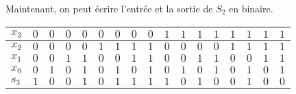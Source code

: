\documentclass{article}
\begin{document}
Maintenant, on peut écrire l'entrée et la sortie de $S_{2}$ en binaire.
\medbreak
\begin{center}
\begin{tabular}{|l|l|l|l|l|l|l|l|l|l|l|l|l|l|l|l|l|}
\hline
\multicolumn{1}{|l|}{$x_{3}$}&	\multicolumn{1}{|l|}{ $0$}&	\multicolumn{1}{|l|}{ $0$}&	\multicolumn{1}{|l|}{ $0$}&	\multicolumn{1}{|l|}{ $0$}&	\multicolumn{1}{|l|}{ $0$}&	\multicolumn{1}{|l|}{ $0$}&	\multicolumn{1}{|l|}{ $0$}&	\multicolumn{1}{|l|}{ $0$}&	\multicolumn{1}{|l|}{ $1$}&	\multicolumn{1}{|l|}{ $1$}&	\multicolumn{1}{|l|}{ $1$}&	\multicolumn{1}{|l|}{ $1$}&	\multicolumn{1}{|l|}{ $1$}&	\multicolumn{1}{|l|}{ $1$}&	\multicolumn{1}{|l|}{ $1$}&	\multicolumn{1}{|l|}{ $1$}	\\
\hline
\multicolumn{1}{|l|}{ $x_{2}$}&	\multicolumn{1}{|l|}{ $0$}&	\multicolumn{1}{|l|}{ $0$}&	\multicolumn{1}{|l|}{ $0$}&	\multicolumn{1}{|l|}{ $0$}&	\multicolumn{1}{|l|}{ $1$}&	\multicolumn{1}{|l|}{ $1$}&	\multicolumn{1}{|l|}{ $1$}&	\multicolumn{1}{|l|}{ $1$}&	\multicolumn{1}{|l|}{ $0$}&	\multicolumn{1}{|l|}{ $0$}&	\multicolumn{1}{|l|}{ $0$}&	\multicolumn{1}{|l|}{ $0$}&	\multicolumn{1}{|l|}{ $1$}&	\multicolumn{1}{|l|}{ $1$}&	\multicolumn{1}{|l|}{ $1$}&	\multicolumn{1}{|l|}{ $1$}	\\
\hline
\multicolumn{1}{|l|}{ $x_{1}$}&	\multicolumn{1}{|l|}{ $0$}&	\multicolumn{1}{|l|}{ $0$}&	\multicolumn{1}{|l|}{ $1$}&	\multicolumn{1}{|l|}{ $1$}&	\multicolumn{1}{|l|}{ $0$}&	\multicolumn{1}{|l|}{ $0$}&	\multicolumn{1}{|l|}{ $1$}&	\multicolumn{1}{|l|}{ $1$}&	\multicolumn{1}{|l|}{ $0$}&	\multicolumn{1}{|l|}{ $0$}&	\multicolumn{1}{|l|}{ $1$}&	\multicolumn{1}{|l|}{ $1$}&	\multicolumn{1}{|l|}{ $0$}&	\multicolumn{1}{|l|}{ $0$}&	\multicolumn{1}{|l|}{ $1$}&	\multicolumn{1}{|l|}{ $1$}	\\
\hline
\multicolumn{1}{|l|}{ $x_{0}$}&	\multicolumn{1}{|l|}{ $0$}&	\multicolumn{1}{|l|}{ $1$}&	\multicolumn{1}{|l|}{ $0$}&	\multicolumn{1}{|l|}{ $1$}&	\multicolumn{1}{|l|}{ $0$}&	\multicolumn{1}{|l|}{ $1$}&	\multicolumn{1}{|l|}{ $0$}&	\multicolumn{1}{|l|}{ $1$}&	\multicolumn{1}{|l|}{ $0$}&	\multicolumn{1}{|l|}{ $1$}&	\multicolumn{1}{|l|}{ $0$}&	\multicolumn{1}{|l|}{ $1$}&	\multicolumn{1}{|l|}{ $0$}&	\multicolumn{1}{|l|}{ $1$}&	\multicolumn{1}{|l|}{ $0$}&	\multicolumn{1}{|l|}{ $1$}	\\
\hline
\hline
\multicolumn{1}{|l|}{$s_{3}$}&	\multicolumn{1}{|l|}{ $1$}&	\multicolumn{1}{|l|}{ $0$}&	\multicolumn{1}{|l|}{ $0$}&	\multicolumn{1}{|l|}{ $1$}&	\multicolumn{1}{|l|}{ $0$}&	\multicolumn{1}{|l|}{ $1$}&	\multicolumn{1}{|l|}{ $1$}&	\multicolumn{1}{|l|}{ $1$}&	\multicolumn{1}{|l|}{ $1$}&	\multicolumn{1}{|l|}{ $0$}&	\multicolumn{1}{|l|}{ $1$}&	\multicolumn{1}{|l|}{ $0$}&	\multicolumn{1}{|l|}{ $0$}&	\multicolumn{1}{|l|}{ $1$}&	\multicolumn{1}{|l|}{ $0$}&	\multicolumn{1}{|l|}{ $0$}	\\

\end{tabular}
\end{center}
\end{document}
